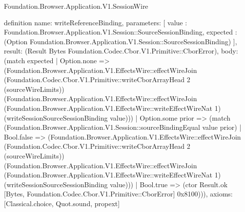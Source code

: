\begin{lexlean}{Foundation.Browser.Application.V1.SessionWire}
\begin{semanticmodule}
definition{
  name: writeReferenceBinding,
  parameters: [
    value : Foundation.Browser.Application.V1.Session::SourceSessionBinding,
    expected : (Option Foundation.Browser.Application.V1.Session::SourceSessionBinding)
  ],
  result: (Result Bytes Foundation.Codec.Cbor.V1.Primitive::CborError),
  body: (match expected
    | Option.none => (Foundation.Browser.Application.V1.EffectsWire::effectWireJoin (Foundation.Codec.Cbor.V1.Primitive::writeCborArrayHead 2 (sourceWireLimits)) (Foundation.Browser.Application.V1.EffectsWire::effectWireJoin (Foundation.Browser.Application.V1.EffectsWire::writeEffectWireNat 1) (writeSessionSourceSessionBinding value)))
    | Option.some prior => (match (Foundation.Browser.Application.V1.Session::sourceBindingEqual value prior)
      | Bool.false => (Foundation.Browser.Application.V1.EffectsWire::effectWireJoin (Foundation.Codec.Cbor.V1.Primitive::writeCborArrayHead 2 (sourceWireLimits)) (Foundation.Browser.Application.V1.EffectsWire::effectWireJoin (Foundation.Browser.Application.V1.EffectsWire::writeEffectWireNat 1) (writeSessionSourceSessionBinding value)))
      | Bool.true => (ctor Result.ok [Bytes, Foundation.Codec.Cbor.V1.Primitive::CborError] 0x8100))),
  axioms: [Classical.choice, Quot.sound, propext]
}


\end{semanticmodule}
\end{lexlean}
